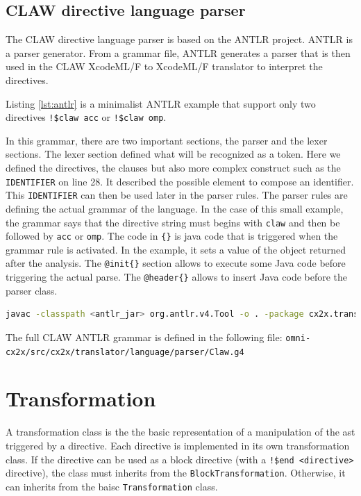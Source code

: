 \documentclass[a4paper, 11pt]{report}
\def\xcodeml{XcodeML/F\xspace}
\begin{document}
\section{CLAW directive language parser}
The CLAW directive language parser is based on the ANTLR project. ANTLR is a parser generator. From a grammar file, ANTLR generates a parser that is then used in the CLAW \xcodeml to \xcodeml translator to interpret the directives. 



Listing \ref{lst:antlr} is a minimalist ANTLR example that support only two directives \lstinline|!$claw acc| or \lstinline|!$claw omp|.

In this grammar, there are two important sections, the parser and the lexer sections. The lexer section defined what will be recognized as a token. Here we defined the directives, the clauses but also more complex construct such as the \lstinline|IDENTIFIER| on line 28. It described the possible element to compose an identifier. This \lstinline|IDENTIFIER| can then be used later in the parser rules. 
The parser rules are defining the actual grammar of the language. In the case of this small example, the grammar says that the directive string must begins with \lstinline|claw| and then be followed by \lstinline|acc| or \lstinline|omp|. The code in \lstinline|{}| is java code that is triggered when the grammar rule is activated. In the example, it sets a value of the object returned after the analysis.
The \lstinline|@init{}| section allows to execute some Java code before triggering the actual parse. The \lstinline|@header{}| allows to insert Java code before the parser class.

\begin{lstlisting}[label=lst:antlr_cmd, caption=ANTLR parser generation command, language=bash]
javac -classpath <antlr_jar> org.antlr.v4.Tool -o . -package cx2x.translator.language.parser Claw.g4
\end{lstlisting}

The full CLAW ANTLR grammar is defined in the following file: \lstinline|omni-cx2x/src/cx2x/translator/language/parser/Claw.g4|

\chapter{Transformation}
A transformation class is the the basic representation of a manipulation of the \gls{ast} triggered by a directive. Each directive is implemented in its own transformation class. If the directive can be used as a block directive (with a \lstinline|!$end <directive>| directive), the class must inherits from the \lstinline!BlockTransformation!. Otherwise, it can inherits from the baisc \lstinline!Transformation! class.
\end{document}
